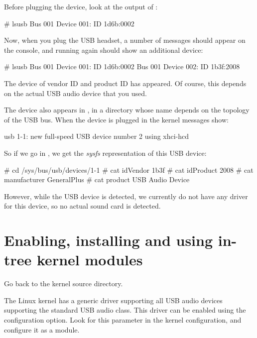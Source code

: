 Before plugging the device, look at the output of :

\begin{bashinput}
# lsusb
Bus 001 Device 001: ID 1d6b:0002
\end{bashinput}

Now, when you plug the USB headset, a number of messages should appear
on the console, and running  again should show an
additional device:

\begin{bashinput}
# lsusb
Bus 001 Device 001: ID 1d6b:0002
Bus 001 Device 002: ID 1b3f:2008
\end{bashinput}

The device of vendor ID  and product ID  has
appeared. Of course, this depends on the actual USB audio device
that you used.

The device also appears in , in a
directory whose name depends on the topology of the USB bus. When the
device is plugged in the kernel messages show:

\begin{bashinput}
usb 1-1: new full-speed USB device number 2 using xhci-hcd
\end{bashinput}

So if we go in , we get the {\em
sysfs} representation of this USB device:

\begin{bashinput}
# cd /sys/bus/usb/devices/1-1
# cat idVendor
1b3f
# cat idProduct
2008
# cat manufacturer
GeneralPlus
# cat product
USB Audio Device
\end{bashinput}

However, while the USB device is detected, we currently do not have
any driver for this device, so no actual sound card is detected.

\section{Enabling, installing and using in-tree kernel modules}

Go back to the kernel source directory.

The Linux kernel has a generic driver supporting all USB audio devices
supporting the standard USB audio class. This driver can be enabled
using the  configuration option. Look
for this parameter in the kernel configuration, and configure it
as a module.

